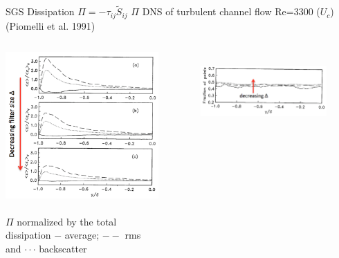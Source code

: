 \begin{frame}{SGS Dissipation $\Pi = -\tau_{ij}\widetilde{S}_{ij}$}
$\Pi$ DNS of turbulent channel flow Re=3300 ($U_c$) (Piomelli et al. 1991)    \begin{columns}
    \begin{column}{.5\textwidth}
    \begin{minipage}[c][.4\textheight][c]{\linewidth}
    \includegraphics[width=\textwidth]{apriori9}
    ~\\\tiny{$\Pi$ normalized by the total dissipation \newline$-$ average; $--$ rms and $\cdot\cdot\cdot$ backscatter}
      \end{minipage}
    \end{column}
    \begin{column}{.48\textwidth}
      \begin{figure}
      ~\\\includegraphics[width=1\textwidth]{apriori10}

\end{figure}
\end{column}
\end{columns}
\end{frame}
